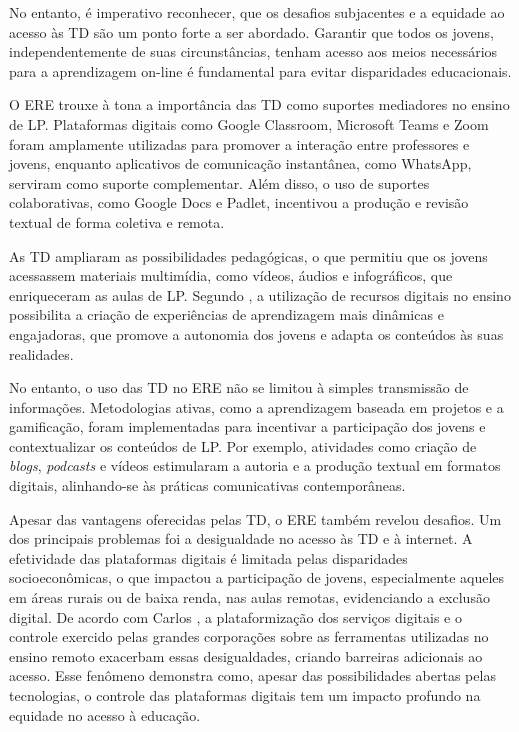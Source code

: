 \documentclass[portuguese]{textolivre}
\begin{document}
No entanto, é imperativo reconhecer, que os desafios subjacentes e a equidade ao acesso às TD são um ponto forte a ser abordado. Garantir que todos os jovens, independentemente de suas circunstâncias, tenham acesso aos meios necessários para a aprendizagem on-line é fundamental para evitar disparidades educacionais.

O ERE trouxe à tona a importância das TD como suportes mediadores no ensino de LP. Plataformas digitais como Google Classroom, Microsoft Teams e Zoom foram amplamente utilizadas para promover a interação entre professores e jovens, enquanto aplicativos de comunicação instantânea, como WhatsApp, serviram como suporte complementar. Além disso, o uso de suportes colaborativas, como Google Docs e Padlet, incentivou a produção e revisão textual de forma coletiva e remota.

As TD ampliaram as possibilidades pedagógicas, o que permitiu que os jovens acessassem materiais multimídia, como vídeos, áudios e infográficos, que enriqueceram as aulas de LP. Segundo \textcite{moran2015}, a utilização de recursos digitais no ensino possibilita a criação de experiências de aprendizagem mais dinâmicas e engajadoras, que promove a autonomia dos jovens e adapta os conteúdos às suas realidades.

No entanto, o uso das TD no ERE não se limitou à simples transmissão de informações. Metodologias ativas, como a aprendizagem baseada em projetos e a gamificação, foram implementadas para incentivar a participação dos jovens e contextualizar os conteúdos de LP. Por exemplo, atividades como criação de \textit{blogs}, \textit{podcasts} e vídeos estimularam a autoria e a produção textual em formatos digitais, alinhando-se às práticas comunicativas contemporâneas.

Apesar das vantagens oferecidas pelas TD, o ERE também revelou desafios.  Um dos principais problemas foi a desigualdade no acesso às TD e à internet. A efetividade das plataformas digitais é limitada pelas disparidades socioeconômicas, o que impactou a participação de jovens, especialmente aqueles em áreas rurais ou de baixa renda, nas aulas remotas, evidenciando a exclusão digital. De acordo com Carlos \textcite{andrea2020pesquisando}, a plataformização dos serviços digitais e o controle exercido pelas grandes corporações sobre as ferramentas utilizadas no ensino remoto exacerbam essas desigualdades, criando barreiras adicionais ao acesso. Esse fenômeno demonstra como, apesar das possibilidades abertas pelas tecnologias, o controle das plataformas digitais tem um impacto profundo na equidade no acesso à educação.
\end{document}
